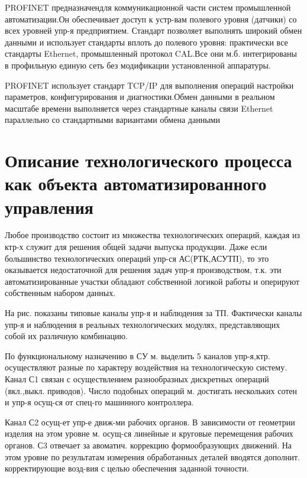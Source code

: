 \documentclass[unicode, 12pt, a4paper, oneside]{article}
\begin{document}
PROFINET предназначендля коммуникационной части систем промышленной автоматизации.Он обеспечивает доступ к устр-вам полевого уровня (датчики) со всех уровней упр-я предприятием. Стандарт позволяет выполнять широкий обмен данными и использует стандарты вплоть до полевого уровня: практически все стандарты Ethernet, промышленный протокол CAL.Все они м.б. интегрированы в профильную единую сеть без модификации установленной аппаратуры.

PROFINET использует стандарт TCP/IP для выполнения операций настройки параметров, конфигурирования и диагностики.Обмен данными в реальном масштабе времени выполняется через стандартные каналы связи Ethernet параллельно со стандартными вариантами обмена данными

\section{Описание технологического процесса как объекта автоматизированного управления }

Любое производство состоит из множества технологических операций, каждая из ктр-х служит для решения общей задачи выпуска продукции. Даже если большинство технологических операций упр-ся АС(РТК,АСУТП), то это оказывается недостаточной для решения задач упр-я производством, т.к. эти автоматизированные участки обладают собственной логикой работы и оперируют собственным набором данных.


На рис. показаны типовые каналы упр-я и наблюдения за ТП. Фактически каналы упр-я и наблюдения в реальных технологических модулях, представляющих собой их различную комбинацию.

По функциональному назначению в СУ м. выделить 5 каналов упр-я,ктр. осуществляют разные по характеру воздействия на технологическую систему. 
Канал С1 связан с осуществлением разнообразных дискретных операций (вкл.,выкл. приводов). Число подобных операций м. достигать нескольких сотен и упр-я осущ-ся от спец-го машинного контроллера.

Канал С2 осущ-ет упр-е движ-ми рабочих органов. В зависимости от геометрии изделия на этом уровне м. осущ-ся линейные и круговые перемещения рабочих органов.
С3 отвечает за авоматич. коррекцию формообразующих движений. На этом уровне по результатам измерения обработанных деталей вводятся дополнит. корректирующие возд-вия с целью обеспечения заданной точности.
\end{document}
